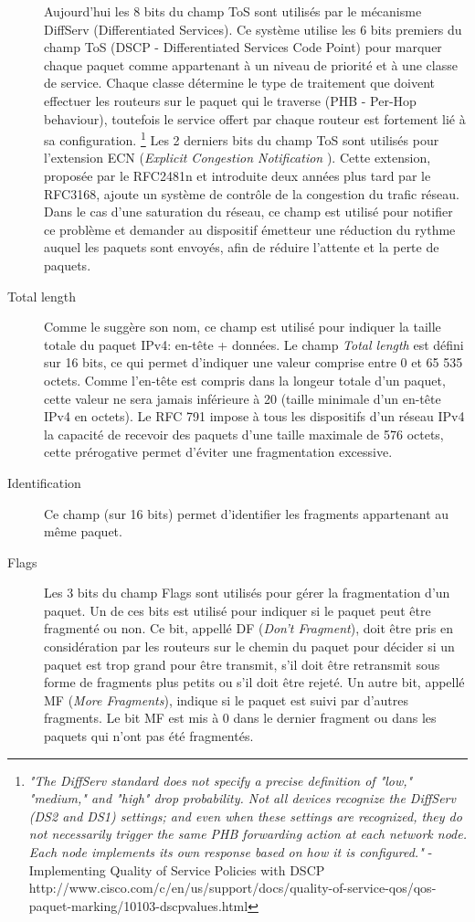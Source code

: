 \begin{description}
Aujourd'hui les 8 bits du champ ToS sont utilisés par le mécanisme DiffServ
(Differentiated Services). Ce système utilise les 6 bits premiers du champ
ToS (DSCP - Differentiated Services Code Point) pour marquer chaque paquet
comme appartenant à un niveau de priorité et à une classe de service. Chaque
classe détermine le type de traitement que doivent effectuer les routeurs sur le paquet qui le traverse
 (PHB - Per-Hop behaviour), toutefois le service offert
par chaque routeur est fortement lié à sa configuration.
\footnote {
{\it "The DiffServ standard does not specify a precise definition of "low," "medium,"
and "high" drop probability. Not all devices recognize the DiffServ (DS2 and
DS1) settings; and even when these settings are recognized, they do not
necessarily trigger the same PHB forwarding action at each network node. Each
node implements its own response based on how it is configured."} - 
Implementing Quality of Service Policies with DSCP
http://www.cisco.com/c/en/us/support/docs/quality-of-service-qos/qos-paquet-marking/10103-dscpvalues.html}
Les 2 derniers bits du champ ToS sont utilisés pour l'extension ECN ({\it Explicit Congestion
Notification }). Cette extension, proposée par le RFC2481n et introduite deux années plus tard par le RFC3168,
ajoute un système de contrôle de la congestion du trafic réseau. Dans le cas d'une saturation
du réseau, ce champ est utilisé pour notifier ce problème et demander au dispositif émetteur
une réduction du rythme auquel les paquets sont envoyés, afin de réduire l'attente et
la perte de paquets.

\item [Total length]
Comme le suggère son nom, ce champ est utilisé pour indiquer la taille totale du
paquet IPv4: en-tête + données. Le champ {\it Total length} est défini sur 16
bits, ce qui permet d'indiquer une valeur comprise entre 0 et 65 535 octets. Comme l'en-tête
est compris dans la longeur totale d'un paquet, cette valeur ne sera jamais inférieure
à 20 (taille minimale d'un en-tête IPv4 en octets).
Le RFC 791 impose à tous les dispositifs d'un réseau IPv4 la capacité de recevoir
des paquets d'une taille maximale de 576 octets, cette prérogative permet d'éviter une fragmentation excessive.

\item [Identification]
Ce champ (sur 16 bits) permet d'identifier les fragments appartenant au même paquet.

\item [Flags]
Les 3 bits du champ Flags sont utilisés pour gérer la fragmentation d'un paquet.
Un de ces bits est utilisé pour indiquer si le paquet peut être fragmenté ou
non. Ce bit, appellé DF ({\it Don't Fragment}), doit être pris en considération
par les routeurs sur le chemin du paquet pour décider si un paquet est trop grand pour être
transmit, s'il doit être retransmit sous forme de fragments plus petits ou s'il doit être rejeté. 
Un autre bit, appellé MF ({\it More Fragments}), indique si le paquet est suivi 
par d'autres fragments. Le bit MF est mis à 0 dans le dernier fragment ou dans
les paquets qui n'ont pas été fragmentés.


\end{description}
